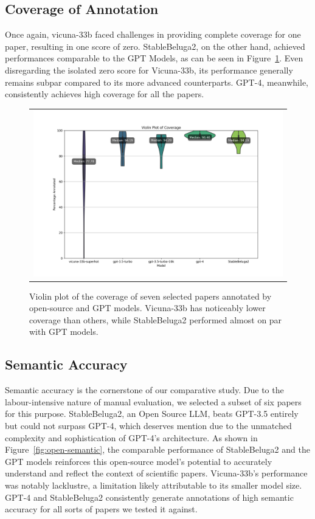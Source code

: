 \subsection{Coverage of Annotation}

Once again, vicuna-33b faced challenges in providing complete coverage for one paper, resulting in one score of zero. StableBeluga2, on the other hand, achieved performances comparable to the GPT Models, as can be seen in Figure~\ref{fig:open-coverage}. Even disregarding the isolated zero score for Vicuna-33b, its performance generally remains subpar compared to its more advanced counterparts. GPT-4, meanwhile, consistently achieves high coverage for all the papers.

\begin{figure}[htpb]
  \centering
  \begin{tabular}{c}
  \includegraphics[width=14cm]{images/open-coverage.png}
  \end{tabular}
  \caption[Open Source Coverage]{Violin plot of the coverage of seven selected papers annotated by open-source and GPT models. Vicuna-33b has noticeably lower coverage than others, while StableBeluga2 performed almost on par with GPT models.}\label{fig:open-coverage}
\end{figure}

\subsection{Semantic Accuracy}

Semantic accuracy is the cornerstone of our comparative study. Due to the labour-intensive nature of manual evaluation, we selected a subset of six papers for this purpose. StableBeluga2, an Open Source LLM, beats GPT-3.5 entirely but could not surpass GPT-4, which deserves mention due to the unmatched complexity and sophistication of GPT-4's architecture. As shown in Figure~\ref{fig:open-semantic}, the comparable performance of StableBeluga2 and the GPT models reinforces this open-source model's potential to accurately understand and reflect the context of scientific papers. Vicuna-33b's performance was notably lacklustre, a limitation likely attributable to its smaller model size. GPT-4 and StableBeluga2 consistently generate annotations of high semantic accuracy for all sorts of papers we tested it against.

